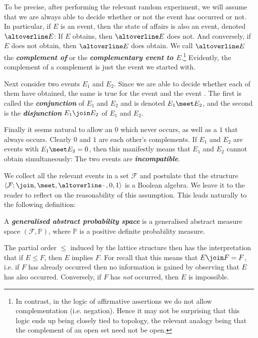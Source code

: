 \documentclass[article, a4paper, 11pt, oneside]{memoir}
\numberwithin{equation}{chapter}
\newcommand{\calF}{\mathcal{F}}
\renewcommand{\P}{\mathbb{P}}
\newcommand{\keyword}[1]{{\itshape\bfseries #1}}
\begin{document}
To be precise, after performing the relevant random experiment, we will assume that we are always able to decide whether or not the event has occurred or not. In particular, if $E$ is an event, then the state of affairs  is also an event, denoted $\compl{E}$: If $E$ obtains, then $\compl{E}$ does not. And conversely, if $E$ does not obtain, then $\compl{E}$ does obtain. We call $\compl{E}$ the \keyword{complement of} or the \keyword{complementary event to $E$}.\footnote{In contrast, in the logic of affirmative assertions we do not allow complementation (i.e. negation). Hence it may not be surprising that this logic ends up being closely tied to topology, the relevant analogy being that the complement of an open set need not be open.} Evidently, the complement of a complement is just the event we started with.

Next consider two events $E_1$ and $E_2$. Since we are able to decide whether each of them have obtained, the same is true for the event  and the event . The first is called the \keyword{conjunction} of $E_1$ and $E_2$ and is denoted $E_1 \meet E_2$, and the second is the \keyword{disjunction} $E_1 \join E_2$ of $E_1$ and $E_2$.

Finally it seems natural to allow an  $0$ which never occurs, as well as a  $1$ that always occurs. Clearly $0$ and $1$ are each other's complements. If $E_1$ and $E_2$ are events with $E_1 \meet E_2 = 0$, then this manifestly means that $E_1$ and $E_2$ cannot obtain simultaneously: The two events are \keyword{incompatible}.

We collect all the relevant events in a set $\calF$ and postulate that the structure $\langle \calF; \join, \meet, \compl{\,\cdot\,\vphantom{e}}, 0, 1 \rangle$ is a Boolean algebra. We leave it to the reader to reflect on the reasonability of this assumption. This leads naturally to the following definition:

\begin{definition}
    A \keyword{generalised abstract probability space} is a generalised abstract measure space $(\calF, \P)$, where $\P$ is a positive definite probability measure.
\end{definition}
%
The partial order $\leq$ induced by the lattice structure then has the interpretation that if $E \leq F$, then $E$ implies $F$. For recall that this means that $E \join F = F$, i.e. if $F$ has already occurred then no information is gained by observing that $E$ has also occurred. Conversely, if $F$ has \emph{not} occurred, then $E$ is impossible.
\end{document}

